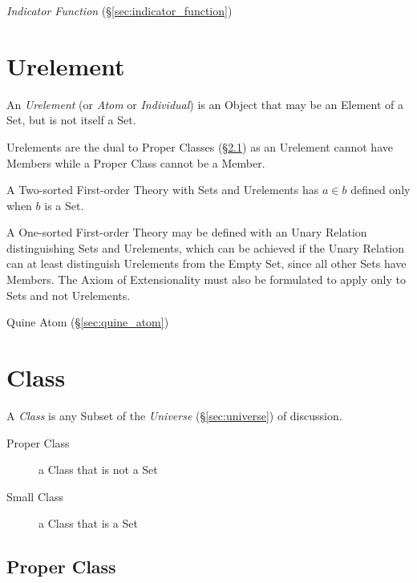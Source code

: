 \emph{Indicator Function} (\S\ref{sec:indicator_function})



\section{Urelement}\label{sec:urelement}

An \emph{Urelement} (or \emph{Atom} or \emph{Individual}) is an Object
that may be an Element of a Set, but is not itself a Set.

Urelements are the dual to Proper Classes (\S\ref{sec:proper_class})
as an Urelement cannot have Members while a Proper Class cannot be a
Member.

A Two-sorted First-order Theory with Sets and Urelements has $a \in b$
defined only when $b$ is a Set.

A One-sorted First-order Theory may be defined with an Unary Relation
distinguishing Sets and Urelements, which can be achieved if the Unary
Relation can at least distinguish Urelements from the Empty Set, since
all other Sets have Members. The Axiom of Extensionality must also be
formulated to apply only to Sets and not Urelements.

Quine Atom (\S\ref{sec:quine_atom})



\section{Class}\label{sec:class}

A \emph{Class} is any Subset of the \emph{Universe}
(\S\ref{sec:universe}) of discussion.

\begin{description}
  \item [Proper Class] a Class that is not a Set
  \item [Small Class] a Class that is a Set
\end{description}



\subsection{Proper Class}\label{sec:proper_class}


